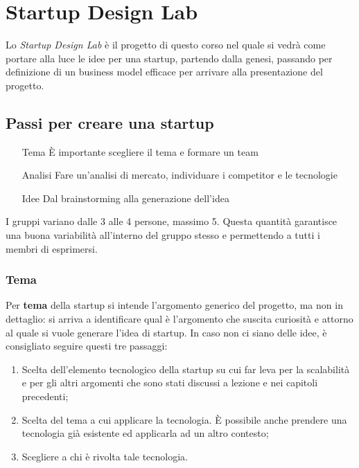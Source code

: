 \chapter{Startup Design Lab}

Lo \emph{Startup Design Lab} è il progetto di questo corso nel quale si vedrà
come portare alla luce le idee per una startup, partendo dalla genesi, passando
per definizione di un business model efficace per arrivare alla presentazione
del progetto.

\section{Passi per creare una startup}

\begin{itemize}
 \item[Tema] È importante scegliere il tema e formare un team
 \item[Analisi] Fare un'analisi di mercato, individuare i competitor e le
tecnologie
 \item[Idee] Dal brainstorming alla generazione dell'idea
\end{itemize}


I gruppi variano dalle 3 alle 4 persone, massimo 5. Questa quantità garantisce
una buona variabilità all'interno del gruppo stesso e permettendo a tutti i
membri di esprimersi.

\subsection{Tema}
Per \textbf{tema} della startup si intende l'argomento generico del progetto,
ma non in dettaglio: si arriva a identificare qual è l'argomento che suscita
curiosità e attorno al quale si vuole generare l'idea di startup. In caso non
ci siano delle idee, è consigliato seguire questi tre passaggi:
\begin{enumerate}
 \item Scelta dell'elemento tecnologico della startup su cui far leva per la
 scalabilità e per gli altri argomenti che sono stati discussi a lezione e nei
 capitoli precedenti;
 \item Scelta del tema a cui applicare la tecnologia. È possibile anche
 prendere una tecnologia già esistente ed applicarla ad un altro contesto;
 \item Scegliere a chi è rivolta tale tecnologia.
\end{enumerate}


